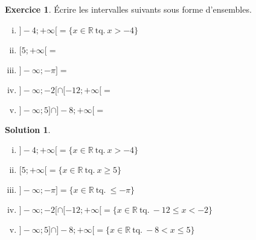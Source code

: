 \documentclass[a4paper, 14pt]{extarticle}
\theoremstyle{plain}
\newtheorem*{sol}{Solution}
\theoremstyle{definition}
\newtheorem{ex}{Exercice}
\newcommand{\R}{\mathbb{R}}
\newcommand{\exe}[2]{
		\begin{ex} #1  \end{ex}
		\begin{sol} #2 \end{sol}
	}
\newcommand{\exe}[2]{
		\begin{ex} #1  \end{ex}
	}
\begin{document}
\exe{
	Écrire les intervalles suivants sous forme d'ensembles.
	\begin{enumerate}[i)]\itemsep10pt
		\item $]{-}4 ; {+}\infty [ = \{ x \in \R \ \text{tq.} \ x > -4 \}$
		\item $[5 ; {+}\infty [ = $
		\item $]{-}\infty ; -\pi ] = $
		\item $]{-}\infty ; -2[ \cap [-12 ; {+}\infty[ = $
		\item $]{-} \infty ; 5] \cap ]-8 ; {+}\infty [ = $
	\end{enumerate}
}{


	\begin{enumerate}[i)]
		\item $]{-}4 ; {+}\infty [ = \{ x \in \R \ \text{tq.} \ x > -4 \}$
		\item $[5 ; {+}\infty [ = \{ x \in \R \ \text{tq.} \ x \geq 5 \}$
		\item $]{-}\infty ; -\pi ] =  \{ x \in \R \ \text{tq.} \ \leq -\pi \}$
		\item $]{-}\infty ; -2[ \cap [-12 ; {+}\infty[ = \{ x \in \R \ \text{tq.} \ -12 \leq x < -2 \}$
		\item $]{-} \infty ; 5] \cap ]-8 ; {+}\infty [ = \{ x \in \R \ \text{tq.} \ -8 < x \leq 5 \}$
	\end{enumerate}

}
\end{document}

